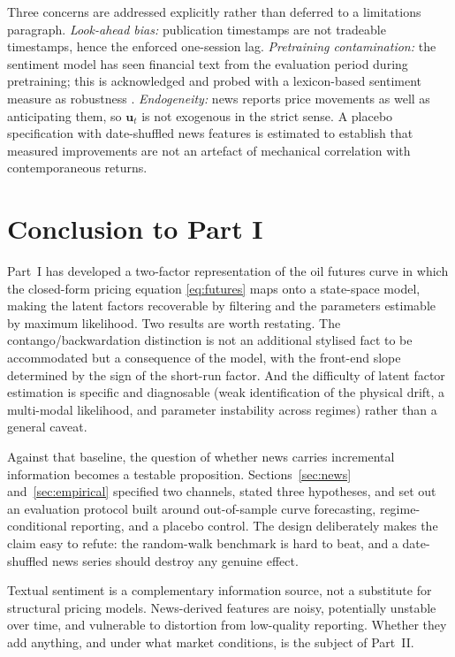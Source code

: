 \documentclass[journal]{IEEEtran}
\begin{document}
Three concerns are addressed explicitly rather than deferred to a limitations paragraph. \emph{Look-ahead bias:} publication timestamps are not tradeable timestamps, hence the enforced one-session lag. \emph{Pretraining contamination:} the sentiment model has seen financial text from the evaluation period during pretraining; this is acknowledged and probed with a lexicon-based sentiment measure as robustness \cite{Li2025}. \emph{Endogeneity:} news reports price movements as well as anticipating them, so $\bm{u}_t$ is not exogenous in the strict sense. A placebo specification with date-shuffled news features is estimated to establish that measured improvements are not an artefact of mechanical correlation with contemporaneous returns.

\section{Conclusion to Part I}

Part~I has developed a two-factor representation of the oil futures curve in which the closed-form pricing equation \eqref{eq:futures} maps onto a state-space model, making the latent factors recoverable by filtering and the parameters estimable by maximum likelihood. Two results are worth restating. The contango/backwardation distinction is not an additional stylised fact to be accommodated but a consequence of the model, with the front-end slope determined by the sign of the short-run factor. And the difficulty of latent factor estimation is specific and diagnosable (weak identification of the physical drift, a multi-modal likelihood, and parameter instability across regimes) rather than a general caveat.

Against that baseline, the question of whether news carries incremental information becomes a testable proposition. Sections~\ref{sec:news} and~\ref{sec:empirical} specified two channels, stated three hypotheses, and set out an evaluation protocol built around out-of-sample curve forecasting, regime-conditional reporting, and a placebo control. The design deliberately makes the claim easy to refute: the random-walk benchmark is hard to beat, and a date-shuffled news series should destroy any genuine effect.

Textual sentiment is a complementary information source, not a substitute for structural pricing models. News-derived features are noisy, potentially unstable over time, and vulnerable to distortion from low-quality reporting. Whether they add anything, and under what market conditions, is the subject of Part~II.
\end{document}
